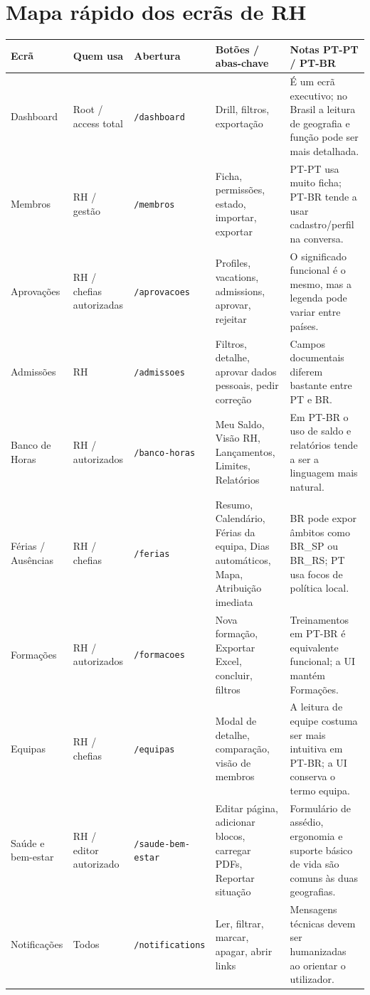 \section{Mapa rápido dos ecrãs de RH}
\begin{longtable}{|p{}|p{}|p{}|p{}|p{}|}
\hline
\textbf{Ecrã} & \textbf{Quem usa} & \textbf{Abertura} & \textbf{Botões / abas-chave} & \textbf{Notas PT-PT / PT-BR} \\
\hline
Dashboard & Root / access total & \texttt{/dashboard} & Drill, filtros, exportação & É um ecrã executivo; no Brasil a leitura de geografia e função pode ser mais detalhada. \\
\hline
Membros & RH / gestão & \texttt{/membros} & Ficha, permissões, estado, importar, exportar & PT-PT usa muito ficha; PT-BR tende a usar cadastro/perfil na conversa. \\
\hline
Aprovações & RH / chefias autorizadas & \texttt{/aprovacoes} & Profiles, vacations, admissions, aprovar, rejeitar & O significado funcional é o mesmo, mas a legenda pode variar entre países. \\
\hline
Admissões & RH & \texttt{/admissoes} & Filtros, detalhe, aprovar dados pessoais, pedir correção & Campos documentais diferem bastante entre PT e BR. \\
\hline
Banco de Horas & RH / autorizados & \texttt{/banco-horas} & Meu Saldo, Visão RH, Lançamentos, Limites, Relatórios & Em PT-BR o uso de saldo e relatórios tende a ser a linguagem mais natural. \\
\hline
Férias / Ausências & RH / chefias & \texttt{/ferias} & Resumo, Calendário, Férias da equipa, Dias automáticos, Mapa, Atribuição imediata & BR pode expor âmbitos como BR\_SP ou BR\_RS; PT usa focos de política local. \\
\hline
Formações & RH / autorizados & \texttt{/formacoes} & Nova formação, Exportar Excel, concluir, filtros & Treinamentos em PT-BR é equivalente funcional; a UI mantém Formações. \\
\hline
Equipas & RH / chefias & \texttt{/equipas} & Modal de detalhe, comparação, visão de membros & A leitura de equipe costuma ser mais intuitiva em PT-BR; a UI conserva o termo equipa. \\
\hline
Saúde e bem-estar & RH / editor autorizado & \texttt{/saude-bem-estar} & Editar página, adicionar blocos, carregar PDFs, Reportar situação & Formulário de assédio, ergonomia e suporte básico de vida são comuns às duas geografias. \\
\hline
Notificações & Todos & \texttt{/notifications} & Ler, filtrar, marcar, apagar, abrir links & Mensagens técnicas devem ser humanizadas ao orientar o utilizador. \\
\hline
\end{longtable}

